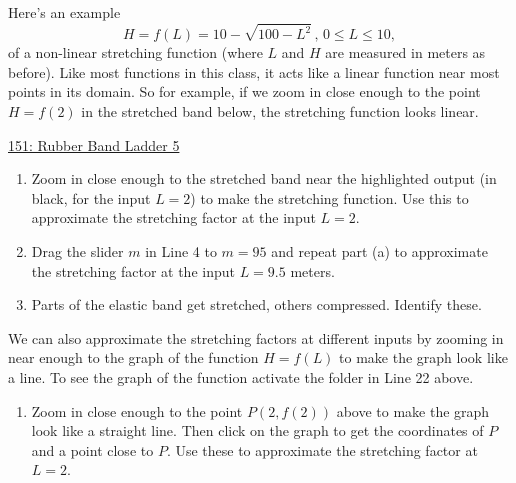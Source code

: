 \documentclass{ximera}
\begin{document}
\begin{example} \label{Ex:JDJFHDtet434t}
Here's an example
\[
      H = f(L) = 10 - \sqrt{100-L^2} \, , \, 0\leq L \leq 10,
\] 
of a non-linear stretching function (where $L$ and $H$ are measured in meters as before). Like most functions in this class, it acts like a linear function near most points in its domain. So for example, if we zoom in close enough to the point $H=f(2)$ in the stretched band below, the stretching function looks linear. %


\begin{onlineOnly}
    \begin{center}
\end{center}
\end{onlineOnly}

\href{https://www.desmos.com/calculator/8cotpdqhzi}{151: Rubber Band Ladder 5}

\begin{question} \label{Q:KMndrergvgbg}

\end{question}
\begin{enumerate}

\item Zoom in close enough to the stretched band near the highlighted output (in black, for the input $L=2$) to make the stretching function. Use this to approximate the stretching factor at the input $L=2$.

\item Drag the slider $m$ in Line 4 to $m=95$ and repeat part (a) to approximate the stretching factor at the input $L=9.5$ meters.

\item Parts of the elastic band get stretched, others compressed. Identify these.
\end{enumerate}

We can also approximate the stretching factors at different inputs by zooming in near enough to the graph of the function $H=f(L)$ to make the graph look like a line. To see the graph of the function activate the folder in Line 22 above.

\begin{enumerate}
\item Zoom in close enough to the point $P(2,f(2))$ above to make the graph look like a straight line. Then click on the graph to get the coordinates of $P$ and a point close to $P$. Use these to approximate the stretching factor at $L=2$.


\end{enumerate}
\end{example}
\end{document}
